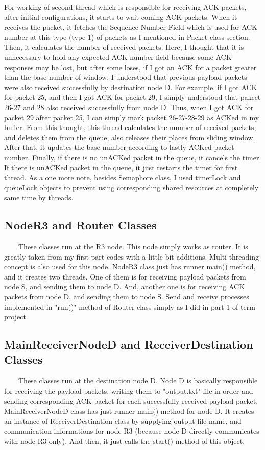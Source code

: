 \documentclass[12pt]{article}
\begin{document}
For working of second thread which is responsible for receiving ACK packets, after initial configurations, it starts to wait coming ACK packets. When it receives the packet, it fetches the Sequence Number Field which is used for ACK number at this type (type 1) of packets as I mentioned in Packet class section. Then, it calculates the number of received packets. Here, I thought that it is unnecessary to hold any expected ACK number field because some ACK responses may be lost, but after some loses, if I got an ACK for a packet greater than the base number of window, I understood that previous payload packets were also received successfully by destination node D. For example, if I got ACK for packet 25, and then I got ACK for packet 29, I simply understood that pakcet 26-27 and 28 also received successfully from node D. Thus, when I got ACK for packet 29 after packet 25, I can simply mark packet 26-27-28-29 as ACKed in my buffer. From this thought, this thread calculates the number of received packets, and deletes them from the queue, also releases their places from sliding window. After that, it updates the base number according to lastly ACKed packet number. Finally, if there is no unACKed packet in the queue, it cancels the timer. If there is unACKed packet in the queue, it just restarts the timer for first thread. As a one more note, besides Semaphore class, I used timerLock and queueLock objects to prevent using corresponding shared resources at completely same time by threads.


\subsection{NodeR3 and Router Classes}
\ \ \ \ These classes run at the R3 node. This node simply works as router. It is greatly taken from my first part codes with a little bit additions. Multi-threading concept is also used for this node. NodeR3 class just has runner main() method, and it creates two threads. One of them is for receiving payload packets from node S, and sending them to node D. And, another one is for receiving ACK packets from node D, and sending them to node S. Send and receive processes implemented in "run()" method of Router class simply as I did in part 1 of term project.

\subsection{MainReceiverNodeD and ReceiverDestination Classes}
\ \ \ \ These classes run at the destination node D. Node D is basically responsible for receiving the payload packets, writing them to "output.txt" file in order and sending corresponding ACK packet for each successfully received payload packet. MainReceiverNodeD class has just runner main() method for node D. It creates an instance of ReceiverDestination class by supplying output file name, and communication informations for node R3 (because node D directly communicates with node R3 only). And then, it just calls the start() method of this object. \\
\end{document}
